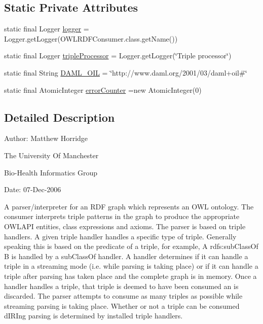 \subsection*{Static Private Attributes}
\begin{DoxyCompactItemize}
\item 
static final Logger \hyperlink{classorg_1_1coode_1_1owlapi_1_1rdfxml_1_1parser_1_1_o_w_l_r_d_f_consumer_a49f2a08caa0b5e9fb1c024f2e8854265}{logger} = Logger.\-get\-Logger(O\-W\-L\-R\-D\-F\-Consumer.\-class.\-get\-Name())
\item 
static final Logger \hyperlink{classorg_1_1coode_1_1owlapi_1_1rdfxml_1_1parser_1_1_o_w_l_r_d_f_consumer_a6b5ac62331b1740af566b9070d9e0e54}{triple\-Processor} = Logger.\-get\-Logger(\char`\"{}Triple processor\char`\"{})
\item 
static final String \hyperlink{classorg_1_1coode_1_1owlapi_1_1rdfxml_1_1parser_1_1_o_w_l_r_d_f_consumer_a763ad6247644f5303528762a6f50029e}{D\-A\-M\-L\-\_\-\-O\-I\-L} = \char`\"{}http\-://www.\-daml.\-org/2001/03/daml+oil\#\char`\"{}
\item 
static final Atomic\-Integer \hyperlink{classorg_1_1coode_1_1owlapi_1_1rdfxml_1_1parser_1_1_o_w_l_r_d_f_consumer_a59ff277c3781b6b47154a920797cbd93}{error\-Counter} =new Atomic\-Integer(0)
\end{DoxyCompactItemize}


\subsection{Detailed Description}
Author\-: Matthew Horridge\par
 The University Of Manchester\par
 Bio-\/\-Health Informatics Group\par
 Date\-: 07-\/\-Dec-\/2006\par
\par
 A parser/interpreter for an R\-D\-F graph which represents an O\-W\-L ontology. The consumer interprets triple patterns in the graph to produce the appropriate O\-W\-L\-A\-P\-I entities, class expressions and axioms. The parser is based on triple handlers. A given triple handler handles a specific type of triple. Generally speaking this is based on the predicate of a triple, for example, A rdfs\-:sub\-Class\-Of B is handled by a sub\-Class\-Of handler. A handler determines if it can handle a triple in a streaming mode (i.\-e. while parsing is taking place) or if it can handle a triple after parsing has taken place and the complete graph is in memory. Once a handler handles a triple, that triple is deemed to have been consumed an is discarded. The parser attempts to consume as many triples as possible while streaming parsing is taking place. Whether or not a triple can be consumed d\-I\-R\-Ing parsing is determined by installed triple handlers. 

